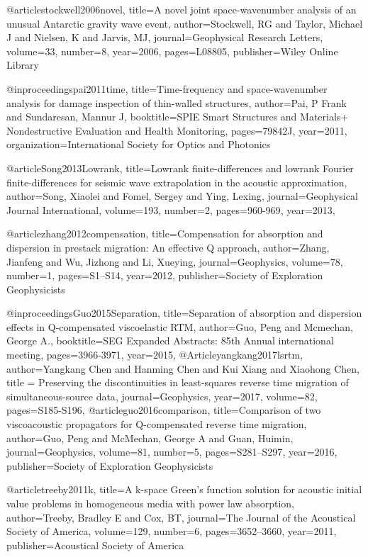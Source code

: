 {@article{stockwell2006novel,
  title={A novel joint space-wavenumber analysis of an unusual Antarctic gravity wave event},
  author={Stockwell, RG and Taylor, Michael J and Nielsen, K and Jarvis, MJ},
  journal={Geophysical Research Letters},
  volume={33},
  number={8},
  year={2006},
  pages={L08805},
  publisher={Wiley Online Library}
}

@inproceedings{pai2011time,
  title={Time-frequency and space-wavenumber analysis for damage inspection of thin-walled structures},
  author={Pai, P Frank and Sundaresan, Mannur J},
  booktitle={SPIE Smart Structures and Materials+ Nondestructive Evaluation and Health Monitoring},
  pages={79842J},
  year={2011},
  organization={International Society for Optics and Photonics}
}


@article{Song2013Lowrank,
  title={Lowrank finite-differences and lowrank {F}ourier finite-differences for seismic wave extrapolation in the acoustic approximation},
  author={Song, Xiaolei and Fomel, Sergey and Ying, Lexing},
  journal={Geophysical Journal International},
  volume={193},
  number={2},
  pages={960-969},
  year={2013},
}

@article{zhang2012compensation,
  title={Compensation for absorption and dispersion in prestack migration: {A}n effective {Q} approach},
  author={Zhang, Jianfeng and Wu, Jizhong and Li, Xueying},
  journal={Geophysics},
  volume={78},
  number={1},
  pages={S1--S14},
  year={2012},
  publisher={Society of Exploration Geophysicists}
}

@inproceedings{Guo2015Separation,
  title={Separation of absorption and dispersion effects in {Q}-compensated viscoelastic {RTM}},
  author={Guo, Peng and Mcmechan, George A.},
  booktitle={SEG Expanded Abstracts: 85th Annual international meeting},
  pages={3966-3971},
  year={2015},
}
@Article{yangkang2017lsrtm,
  author={Yangkang Chen and Hanming Chen and Kui Xiang and Xiaohong Chen},
  title = {Preserving the discontinuities in least-squares reverse time migration of simultaneous-source data},
  journal={Geophysics},
  year=2017,
  volume=82,
  pages={S185-S196},
}
@article{guo2016comparison,
  title={Comparison of two viscoacoustic propagators for {Q}-compensated reverse time migration},
  author={Guo, Peng and McMechan, George A and Guan, Huimin},
  journal={Geophysics},
  volume={81},
  number={5},
  pages={S281--S297},
  year={2016},
  publisher={Society of Exploration Geophysicists}
}


@article{treeby2011k,
  title={A k-space Green's function solution for acoustic initial value problems in homogeneous media with power law absorption},
  author={Treeby, Bradley E and Cox, BT},
  journal={The Journal of the Acoustical Society of America},
  volume={129},
  number={6},
  pages={3652--3660},
  year={2011},
  publisher={Acoustical Society of America}
}

}
